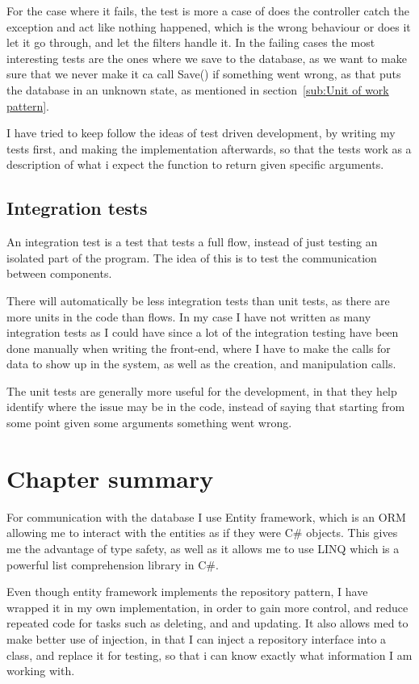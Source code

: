 For the case where it fails, the test is more a case of does the controller
catch the exception and act like nothing happened, which is the wrong behaviour
or does it let it go through, and let the filters handle it. In the failing
cases the most interesting tests are the ones where we save to the database, as
we want to make sure that we never make it ca call Save() if something went
wrong, as that puts the database in an unknown state, as mentioned in
section~\ref{sub:Unit of work pattern}.

I have tried to keep follow the ideas of test driven development, by writing my
tests first, and making the implementation afterwards, so that the tests work as
a description of what i expect the function to return given specific arguments.

\subsection{Integration tests}
\label{sec:integration_tests}
An integration test is a test that tests a full flow, instead of just testing an
isolated part of the program. The idea of this is to test the communication
between components.

There will automatically be less integration tests than unit tests, as there are
more units in the code than flows. In my case I have not written as many
integration tests as I could have since a lot of the integration testing have
been done manually when writing the front-end, where I have to make the calls for
data to show up in the system, as well as the creation, and manipulation calls.

The unit tests are generally more useful for the development, in that they help
identify where the issue may be in the code, instead of saying that starting
from some point given some arguments something went wrong.

\section{Chapter summary}
For communication with the database I use Entity framework, which is an ORM
allowing me to interact with the entities as if they were C\# objects. This
gives me the advantage of type safety, as well as it allows me to use LINQ which
is a powerful list comprehension library in C\#.

Even though entity framework implements the repository pattern, I have wrapped
it in my own implementation, in order to gain more control, and reduce repeated
code for tasks such as deleting, and and updating. It also allows med to make
better use of injection, in that I can inject a repository interface into a
class, and replace it for testing, so that i can know exactly what information I
am working with.

